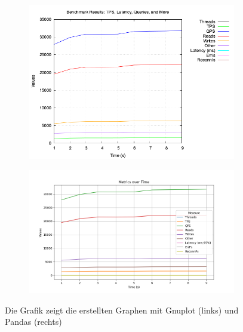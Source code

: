 

\begin{figure}[H]
    \centering
    \begin{subfigure}[t]{0.48\textwidth}
        \includegraphics[width=\textwidth]{PNGs/Demo/sysbench_output}
    \end{subfigure}
    \hfill
    \begin{subfigure}[t]{0.48\textwidth}
        \includegraphics[width=\textwidth]{PNGs/Demo/Summary}
    \end{subfigure}
    \caption[Demo: Gnuplot vs. Pandas]{Die Grafik zeigt die erstellten Graphen mit Gnuplot (links) und Pandas (rechts)}
    \label{fig:demo-graph-generation}
\end{figure}


